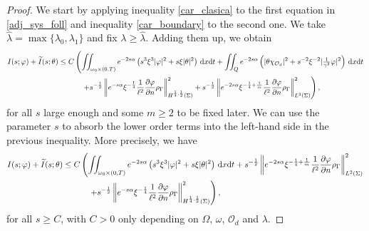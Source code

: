 \documentclass[preprint,10pt]{article}
\numberwithin{equation}{section}
\numberwithin{theorem}{section}
\def\dx{\,\textnormal{d}x}
\def\dt{\textnormal{d}t}
\def\csbd{\rho_{\Gamma}}
\def\dx{\,\textnormal{d}x}
\def\dt{\textnormal{d}t}
\begin{document}
{\begin{proof}
We start by applying inequality \eqref{car_clasica} to the first equation in \eqref{adj_sys_foll} and inequality \eqref{car_boundary} to the second one. We take $\hat \lambda=\max\{\lambda_0,\lambda_1\}$ and fix $\lambda\geq \hat \lambda$. Adding them up, we obtain
%
\begin{equation*}
\begin{split}
I(s;\varphi)+\widetilde{I}(s;\theta)\leq C&\left(\iint_{\omega_0\times(0,T)}e^{-2s\alpha}\left(s^3\xi^3|\varphi|^2+s\xi|\theta|^2\right)\dx\dt +\iint_Q e^{-2s\alpha}\left(|\theta\chi_{\mathcal O_d}|^2+s^{-2}\xi^{-2}|\tfrac{1}{\gamma^2}\varphi|^2\right)\dx\dt\right. \\
&\quad\left. +s^{-\frac{1}{2}}\left\|e^{-s\alpha}\xi^{-\frac{1}{4}}\frac{1}{\ell^2}\frac{\partial \varphi}{\partial n}\csbd \right\|^2_{H^{\frac{1}{4},\frac{1}{2}}(\Sigma)}+s^{-\frac{1}{2}}\left\| e^{-2s\alpha}\xi^{-\frac{1}{4}+\frac{1}{m}} \frac{1}{\ell^2}\frac{\partial \varphi}{\partial n} \csbd \right\|^{2}_{L^2(\Sigma)}  \right),
\end{split}
\end{equation*}
%
for all $s$ large enough and some $m\geq 2$ to be fixed later. We can use the parameter $s$ to absorb the lower order terms into the left-hand side in the previous inequality. More precisely, we have 
%
\begin{equation}\label{car_con_bound}
\begin{split}
I(s;\varphi)+\widetilde{I}(s;\theta)\leq C&\left(\iint_{\omega_0\times(0,T)}e^{-2s\alpha}\left(s^3\xi^3|\varphi|^2+s\xi|\theta|^2\right)\dx\dt + s^{-\frac{1}{2}}\left\| e^{-2s\alpha}\xi^{-\frac{1}{4}+\frac{1}{m}} \frac{1}{\ell^2}\frac{\partial \varphi}{\partial n} \csbd \right\|^{2}_{L^2(\Sigma)} \right. \\
&\quad\left. +s^{-\frac{1}{2}}\left\|e^{-s\alpha}\xi^{-\frac{1}{4}}\frac{1}{\ell^2}\frac{\partial \varphi}{\partial n}\csbd \right\|^2_{H^{\frac{1}{4},\frac{1}{2}}(\Sigma)}  \right),
\end{split}
\end{equation}
%
for all $s\geq C$, with $C>0$ only depending on $\Omega$, $\omega$, $\mathcal O_d$ and $\lambda$. 


\end{proof}}
\end{document}
